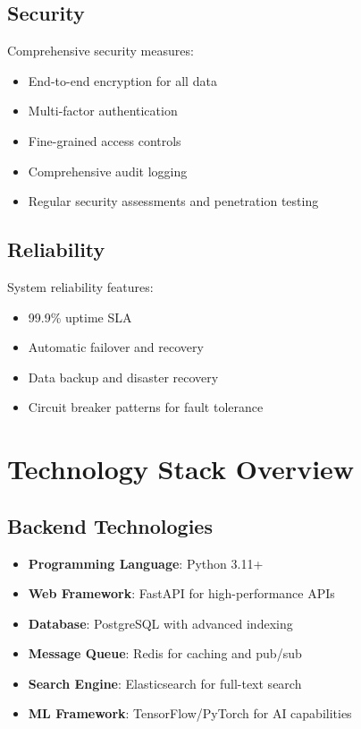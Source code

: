 \documentclass[12pt,a4paper]{article}
\begin{document}
\subsection{Security}
Comprehensive security measures:
\begin{itemize}
    \item End-to-end encryption for all data
    \item Multi-factor authentication
    \item Fine-grained access controls
    \item Comprehensive audit logging
    \item Regular security assessments and penetration testing
\end{itemize}

\subsection{Reliability}
System reliability features:
\begin{itemize}
    \item 99.9\% uptime SLA
    \item Automatic failover and recovery
    \item Data backup and disaster recovery
    \item Circuit breaker patterns for fault tolerance
\end{itemize}

\section{Technology Stack Overview}

\subsection{Backend Technologies}
\begin{itemize}
    \item \textbf{Programming Language}: Python 3.11+
    \item \textbf{Web Framework}: FastAPI for high-performance APIs
    \item \textbf{Database}: PostgreSQL with advanced indexing
    \item \textbf{Message Queue}: Redis for caching and pub/sub
    \item \textbf{Search Engine}: Elasticsearch for full-text search
    \item \textbf{ML Framework}: TensorFlow/PyTorch for AI capabilities
\end{itemize}
\end{document}
